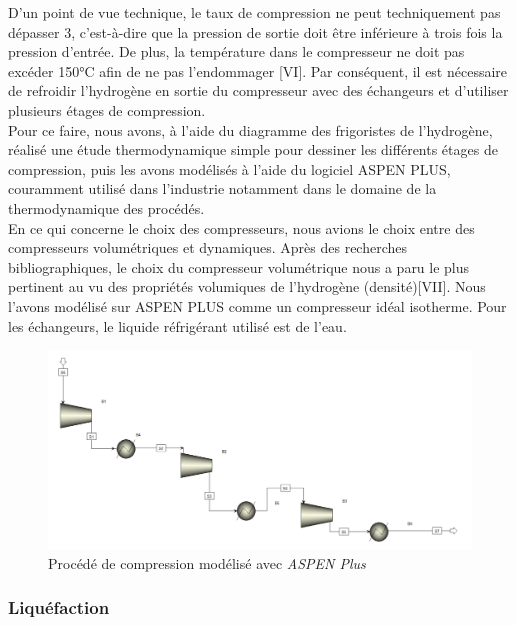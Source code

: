 \documentclass[11pt,french,a4paper]{article}
\begin{document}
D'un point de vue technique, le taux de compression ne peut techniquement pas dépasser 3, c'est-à-dire que la pression de sortie doit être inférieure à trois fois la pression d'entrée. De plus, la température dans le compresseur ne doit pas excéder 150°C afin de ne pas l'endommager [VI]. Par conséquent, il est nécessaire de refroidir l'hydrogène en sortie du compresseur avec des échangeurs et d'utiliser plusieurs étages de compression. \\

Pour ce faire, nous avons, à l’aide du diagramme des frigoristes de l’hydrogène, réalisé une étude thermodynamique simple pour dessiner les différents étages de compression, puis les avons modélisés à l’aide du logiciel ASPEN PLUS, couramment utilisé dans l'industrie notamment dans le domaine de la thermodynamique des procédés. \\

En ce qui concerne le choix des compresseurs, nous avions le choix entre des compresseurs volumétriques et dynamiques. Après des recherches bibliographiques, le choix du compresseur volumétrique nous a paru le plus pertinent au vu des propriétés volumiques de l’hydrogène (densité)[VII]. Nous l’avons modélisé sur ASPEN PLUS comme un compresseur idéal isotherme. Pour les échangeurs, le liquide réfrigérant utilisé est de l’eau. \\

\begin{figure}[h!]
\centering
\includegraphics[width=.8\linewidth]{image/chap3/etage_compression.PNG}
\caption{Procédé de compression modélisé avec \textit{ASPEN Plus} }
 \end{figure}





\subsubsection{Liquéfaction}
\end{document}
